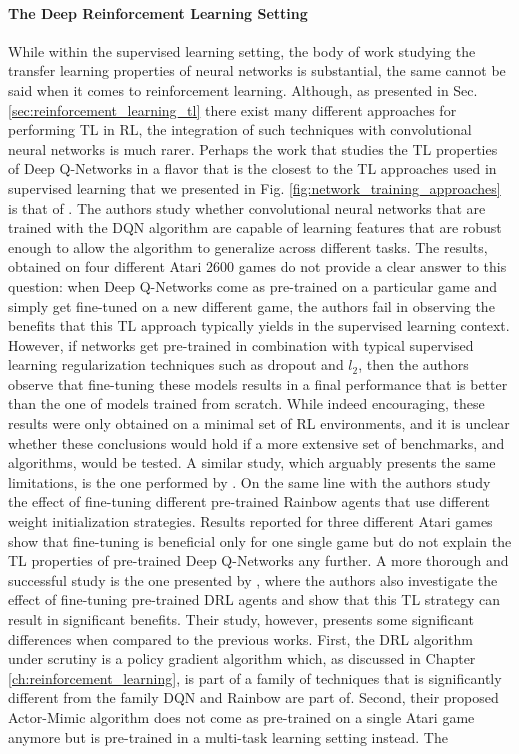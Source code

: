 \paragraph{The Deep Reinforcement Learning Setting}
While within the supervised learning setting, the body of work studying the transfer learning properties of neural networks is substantial, the same cannot be said when it comes to reinforcement learning. Although, as presented in Sec. \ref{sec:reinforcement_learning_tl} there exist many different approaches for performing TL in RL, the integration of such techniques with convolutional neural networks is much rarer. Perhaps the work that studies the TL properties of Deep Q-Networks in a flavor that is the closest to the TL approaches used in supervised learning that we presented in Fig. \ref{fig:network_training_approaches} is that of \citet{farebrother2018generalization}. The authors study whether convolutional neural networks that are trained with the DQN algorithm \cite{mnih2015human} are capable of learning features that are robust enough to allow the algorithm to generalize across different tasks. The results, obtained on four different Atari 2600 games do not provide a clear answer to this question: when Deep Q-Networks come as pre-trained on a particular game and simply get fine-tuned on a new different game, the authors fail in observing the benefits that this TL approach typically yields in the supervised learning context. However, if networks get pre-trained in combination with typical supervised learning regularization techniques such as dropout \cite{srivastava2014dropout} and $l_2$, then the authors observe that fine-tuning these models results in a final performance that is better than the one of models trained from scratch. While indeed encouraging, these results were only obtained on a minimal set of RL environments, and it is unclear whether these conclusions would hold if a more extensive set of benchmarks, and algorithms, would be tested. A similar study, which arguably presents the same limitations, is the one performed by \citet{tyo2020transferable}. On the same line with \citet{farebrother2018generalization} the authors study the effect of fine-tuning different pre-trained Rainbow agents \cite{hessel2018rainbow} that use different weight initialization strategies. Results reported for three different Atari games show that fine-tuning is beneficial only for one single game but do not explain the TL properties of pre-trained Deep Q-Networks any further. A more thorough and successful study is the one presented by \citet{parisotto2015actor}, where the authors also investigate the effect of fine-tuning pre-trained DRL agents and show that this TL strategy can result in significant benefits. Their study, however, presents some significant differences when compared to the previous works. First, the DRL algorithm under scrutiny is a policy gradient algorithm which, as discussed in Chapter \ref{ch:reinforcement_learning}, is part of a family of techniques that is significantly different from the family DQN and Rainbow are part of. Second, their proposed Actor-Mimic algorithm does not come as pre-trained on a single Atari game anymore but is pre-trained in a multi-task learning setting instead. The 